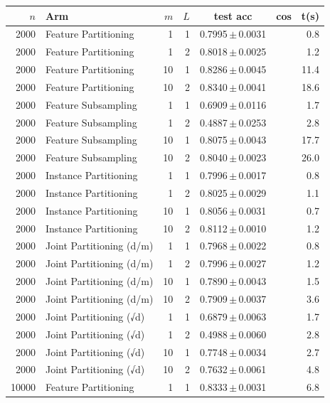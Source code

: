 \begin{table}[ht]
\centering\small
\begin{tabular}{rlrrccr}
\toprule
$n$ & Arm & $m$ & $L$ & test acc & cos & t(s) \\
\midrule
2000 & Feature Partitioning & 1 & 1 & 0.7995\,$\pm$\,0.0031 &  & 0.8 \\
2000 & Feature Partitioning & 1 & 2 & 0.8018\,$\pm$\,0.0025 &  & 1.2 \\
2000 & Feature Partitioning & 10 & 1 & 0.8286\,$\pm$\,0.0045 &  & 11.4 \\
2000 & Feature Partitioning & 10 & 2 & 0.8340\,$\pm$\,0.0041 &  & 18.6 \\
2000 & Feature Subsampling & 1 & 1 & 0.6909\,$\pm$\,0.0116 &  & 1.7 \\
2000 & Feature Subsampling & 1 & 2 & 0.4887\,$\pm$\,0.0253 &  & 2.8 \\
2000 & Feature Subsampling & 10 & 1 & 0.8075\,$\pm$\,0.0043 &  & 17.7 \\
2000 & Feature Subsampling & 10 & 2 & 0.8040\,$\pm$\,0.0023 &  & 26.0 \\
2000 & Instance Partitioning & 1 & 1 & 0.7996\,$\pm$\,0.0017 &  & 0.8 \\
2000 & Instance Partitioning & 1 & 2 & 0.8025\,$\pm$\,0.0029 &  & 1.1 \\
2000 & Instance Partitioning & 10 & 1 & 0.8056\,$\pm$\,0.0031 &  & 0.7 \\
2000 & Instance Partitioning & 10 & 2 & 0.8112\,$\pm$\,0.0010 &  & 1.2 \\
2000 & Joint Partitioning (d/m) & 1 & 1 & 0.7968\,$\pm$\,0.0022 &  & 0.8 \\
2000 & Joint Partitioning (d/m) & 1 & 2 & 0.7996\,$\pm$\,0.0027 &  & 1.2 \\
2000 & Joint Partitioning (d/m) & 10 & 1 & 0.7890\,$\pm$\,0.0043 &  & 1.5 \\
2000 & Joint Partitioning (d/m) & 10 & 2 & 0.7909\,$\pm$\,0.0037 &  & 3.6 \\
2000 & Joint Partitioning (√d) & 1 & 1 & 0.6879\,$\pm$\,0.0063 &  & 1.7 \\
2000 & Joint Partitioning (√d) & 1 & 2 & 0.4988\,$\pm$\,0.0060 &  & 2.8 \\
2000 & Joint Partitioning (√d) & 10 & 1 & 0.7748\,$\pm$\,0.0034 &  & 2.7 \\
2000 & Joint Partitioning (√d) & 10 & 2 & 0.7632\,$\pm$\,0.0061 &  & 4.8 \\
10000 & Feature Partitioning & 1 & 1 & 0.8333\,$\pm$\,0.0031 &  & 6.8 \\

\end{tabular}
\end{table}
